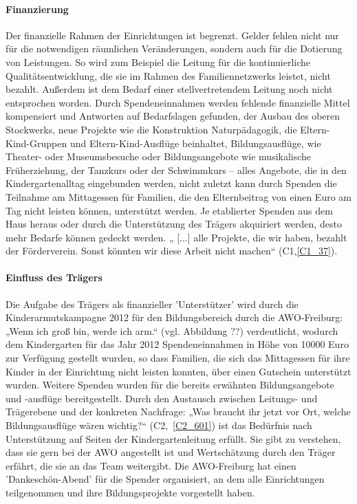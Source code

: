 \paragraph{Finanzierung}
Der finanzielle Rahmen der Einrichtungen ist begrenzt. Gelder fehlen nicht nur für die notwendigen räumlichen Veränderungen, sondern auch für die Dotierung von Leistungen. So wird zum Beispiel die Leitung für die kontinuierliche Qualitätsentwicklung, die sie im Rahmen des Familiennetzwerks leistet, nicht bezahlt. Außerdem ist dem Bedarf einer stellvertretendem Leitung noch nicht entsprochen worden. 
Durch Spendeneinnahmen werden fehlende finanzielle Mittel kompensiert und Antworten auf Bedarfslagen gefunden, der Ausbau des oberen Stockwerks, neue Projekte wie die Konstruktion Naturpädagogik, die Eltern-Kind-Gruppen und Eltern-Kind-Ausflüge beinhaltet, Bildungsausflüge, wie Theater- oder Museumsbesuche oder Bildungsangebote wie musikalische Früherziehung, der Tanzkurs oder der Schwimmkurs – alles Angebote, die in den Kindergartenalltag eingebunden werden, nicht zuletzt kann durch Spenden die Teilnahme am Mittagessen für Familien, die den Elternbeitrag von einen Euro am Tag nicht leisten können, unterstützt werden.
Je etablierter Spenden aus dem Haus heraus oder durch die Unterstützung des Trägers akquiriert werden, desto mehr Bedarfe können gedeckt werden. „ [...] alle Projekte, die wir haben, bezahlt der Förderverein. Sonst könnten wir diese Arbeit nicht machen“ (C1,\ref{C1_37}).

\paragraph{Einfluss des Trägers}
Die Aufgabe des Trägers als finanzieller 'Unterstützer' wird durch die Kinderarmutskampagne 2012 für den Bildungsbereich durch die AWO-Freiburg: „Wenn ich groß bin, werde ich arm.“ (vgl. Abbildung ??) verdeutlicht, wodurch dem Kindergarten für das Jahr 2012 Spendeneinnahmen in Höhe von 10000 Euro zur Verfügung gestellt wurden, so dass Familien, die sich das Mittagessen für ihre Kinder in der Einrichtung nicht leisten konnten, über einen Gutschein unterstützt wurden. Weitere Spenden wurden für die bereits erwähnten Bildungsangebote und -ausflüge bereitgestellt. Durch den Austausch zwischen Leitungs- und Trägerebene und der konkreten Nachfrage: „Was braucht ihr jetzt vor Ort, welche Bildungsausflüge wären wichtig?“ (C2,~\ref{C2_601}) ist das Bedürfnis nach Unterstützung auf Seiten der Kindergartenleitung erfüllt. Sie gibt zu verstehen, dass sie gern bei der AWO angestellt ist und Wertschätzung durch den Träger erfährt, die sie an das Team weitergibt. 
Die AWO-Freiburg hat einen 'Dankeschön-Abend' für die Spender organisiert, an dem alle Einrichtungen teilgenommen und ihre Bildungsprojekte vorgestellt haben. 

